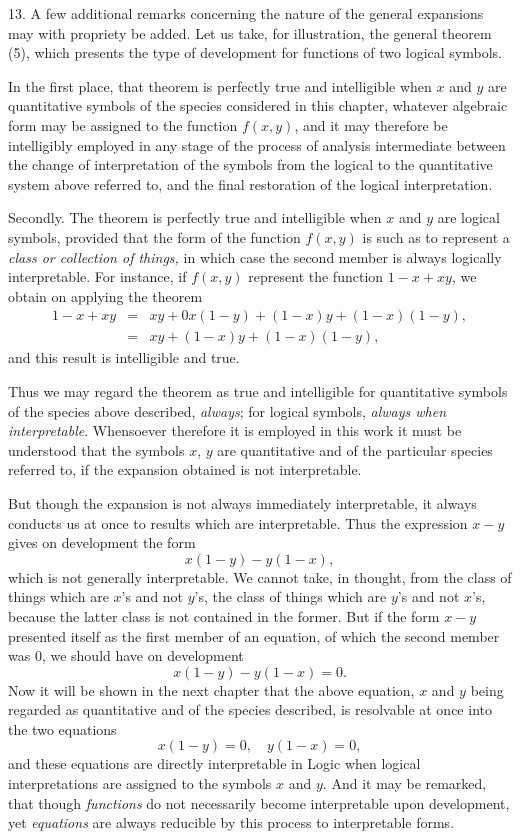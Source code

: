 \documentclass[oneside]{book}
\begin{document}
13. A few additional remarks concerning the nature of the
general expansions may with propriety be added. Let us take,
for illustration, the general theorem (5), which presents the type
of development for functions of two logical symbols.

In the first place, that theorem is perfectly true and intelligible
when $x$ and $y$ are quantitative symbols of the species considered
in this chapter, whatever algebraic form may be assigned
to the function $f\left(x, y\right)$, and it may therefore be intelligibly employed
in any stage of the process of analysis intermediate between
the change of interpretation of the symbols from the
logical to the quantitative system above referred to, and the final
restoration of the logical interpretation.

Secondly. The theorem is perfectly true and intelligible when
$x$ and $y$ are logical symbols, provided that the form of the function
$f\left(x, y\right)$ is such as to represent a \textit{class or collection of things,}
in which case the second member is always logically interpretable.
For instance, if $f\left(x, y\right)$ represent the function $1 - x + xy$, we obtain
on applying the theorem
\begin{eqnarray*}
1-x+xy &=& xy+0x\left(1-y\right)+\left(1-x\right)y+\left(1-x\right)\left(1-y\right),\\
       &=& xy+\left(1-x\right)y+\left(1-x\right)\left(1-y\right),
\end{eqnarray*}
and this result is intelligible and true.

Thus we may regard the theorem as true and intelligible for
quantitative symbols of the species above described, \textit{always}; for
logical symbols, \textit{always when interpretable}. Whensoever therefore
it is employed in this work it must be understood that the
symbols $x$, $y$ are quantitative and of the particular species referred
to, if the expansion obtained is not interpretable.

But though the expansion is not always immediately interpretable,
it always conducts us at once to results which are interpretable.
Thus the expression $x-y$ gives on development
the form
\[
x\left(1-y\right)-y\left(1-x\right),
\]
which is not generally interpretable. We cannot take, in thought,
from the class of things which are $x$'s and not $y$'s, the class of
things which are $y$'s and not $x$'s, because the latter class is not
contained in the former. But if the form $x - y$ presented itself
as the first member of an equation, of which the second member
was $0$, we should have on development
\[
x\left(1-y\right)-y\left(1-x\right)=0.
\]
Now it will be shown in the next chapter that the above equation,
$x$ and $y$ being regarded as quantitative and of the species
described, is resolvable at once into the two equations
\[
x\left(1-y\right)=0, \quad y\left(1-x\right)=0,
\]
and these equations are directly interpretable in Logic when logical
interpretations are assigned to the symbols $x$ and $y$. And
it may be remarked, that though \textit{functions} do not necessarily become
interpretable upon development, yet \textit{equations} are always
reducible by this process to interpretable forms.
\end{document}
